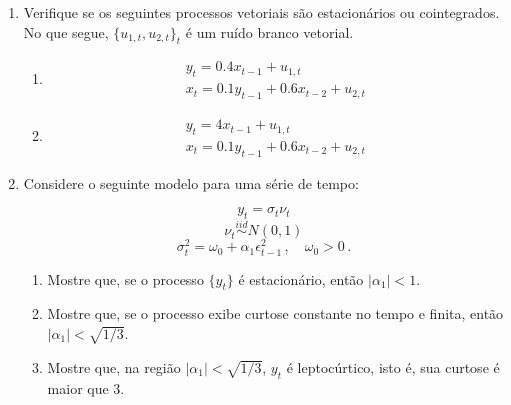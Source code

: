 \documentclass[10pt,a4paper]{article}
\begin{document}
	\begin{enumerate}
		\item Verifique se os seguintes processos vetoriais são estacionários ou cointegrados. No que segue, $\{u_{1,t},u_{2,t}\}_t$ é um ruído branco vetorial.
		
		\begin{enumerate}
			\item 		
			\begin{equation}
				\begin{aligned}
								y_t = 0.4 x_{t-1} + u_{1,t}\\
					x_t = 0.1 y_{t-1} + 0.6 x_{t-2} + u_{2,t}
					\end{aligned}
		\end{equation}
		\item 	\begin{equation}
			\begin{aligned}
				y_t = 4 x_{t-1} + u_{1,t}\\
				x_t = 0.1 y_{t-1} + 0.6 x_{t-2} + u_{2,t}
			\end{aligned}
		\end{equation}
	\end{enumerate}
	
	\item Considere o seguinte modelo para uma série de tempo:
	
	$$y_t = \sigma_t \nu_t$$
	$$\nu_t \overset{iid}{\sim}N(0,1)$$
	$$\sigma_t^2 = \omega_0 + \alpha_1 \epsilon_{t-1}^2\, , \quad \omega_0 > 0\, .$$
	
\begin{enumerate}
	\item Mostre que, se o processo $\{y_t\}$ é estacionário, então $|\alpha_1| < 1$.
	\item Mostre que, se o processo exibe curtose constante no tempo e finita, então $|\alpha_1| < \sqrt{1/3}$.
	\item Mostre que, na região   $|\alpha_1| < \sqrt{1/3}$, $y_t$ é leptocúrtico, isto é, sua curtose é maior que $3$.
\end{enumerate}
	\end{enumerate}
\end{document}
